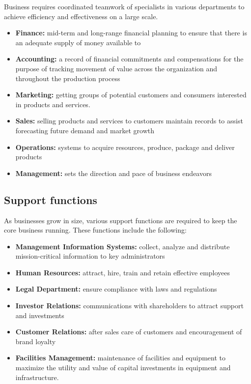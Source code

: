 \documentclass[]{book}
\providecommand{\tightlist}{%
  \setlength{\itemsep}{0pt}\setlength{\parskip}{0pt}}
\begin{document}
Business requires coordinated teamwork of specialists in various departments to achieve efficiency and effectiveness on a large scale.

\begin{itemize}
\tightlist
\item
  \textbf{Finance:} mid-term and long-range financial planning to ensure that there is an adequate supply of money available to
\item
  \textbf{Accounting:} a record of financial commitments and compensations for the purpose of tracking movement of value across the organization and throughout the production process
\item
  \textbf{Marketing:} getting groups of potential customers and consumers interested in products and services.
\item
  \textbf{Sales:} selling products and services to customers maintain records to assist forecasting future demand and market growth
\item
  \textbf{Operations:} systems to acquire resources, produce, package and deliver products
\item
  \textbf{Management:} sets the direction and pace of business endeavors
\end{itemize}

\hypertarget{support-functions}{%
\subsection{Support functions}\label{support-functions}}

As businesses grow in size, various support functions are required to keep the core business running. These functions include the following:

\begin{itemize}
\tightlist
\item
  \textbf{Management Information Systems:} collect, analyze and distribute mission-critical information to key administrators
\item
  \textbf{Human Resources:} attract, hire, train and retain effective employees
\item
  \textbf{Legal Department:} ensure compliance with laws and regulations
\item
  \textbf{Investor Relations:} communications with shareholders to attract support and investments
\item
  \textbf{Customer Relations:} after sales care of customers and encouragement of brand loyalty
\item
  \textbf{Facilities Management:} maintenance of facilities and equipment to maximize the utility and value of capital investments in equipment and infrastructure.
\end{itemize}
\end{document}

